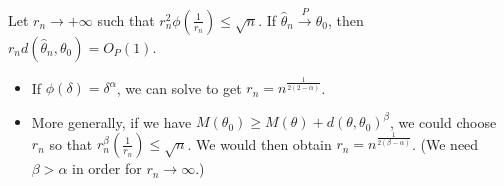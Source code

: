 \documentclass[twoside]{article}
\newcommand{\dis}{\displaystyle}
\newcommand\dlt{\delta}
\def\t{\theta}
\newcommand\cp{\stackrel{P}{\goesto}}
\newcommand\goesto{\rightarrow}
\begin{document}
\begin{itemize}
Let $r_n \goesto +\infty$ such that $r_n^2\phi \left( \dis\frac{1}{r_n} \right)\leq \sqrt{n}$. If $\hat{\t}_n \cp \t_0$, then $r_n d(\hat{\t}_n, \t_0)=O_{P}(1)$.

\begin{itemize}
\item If $\phi(\dlt) = \dlt^{\alpha}$, we can solve to get $r_n = n^{\frac{1}{2(2-\alpha)}}$.

\item More generally, if we have $M(\t_0) \geq M(\t) + d(\t, \t_0)^\beta$, we could choose $r_n$ so that $r_n^\beta \left( \dis\frac{1}{r_n} \right) \leq \sqrt{n}$. We would then obtain $r_n = n^{\frac{1}{2(\beta-\alpha)}}$. (We need $\beta > \alpha$ in order for $r_n \goesto \infty$.)
\end{itemize}

\end{itemize} 

\end{document}
